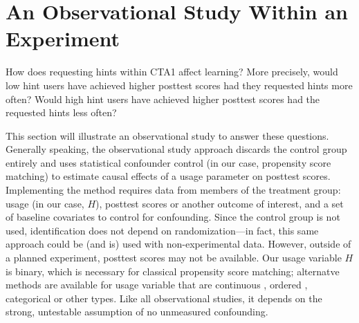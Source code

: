 \documentclass{article}\usepackage[]{graphicx}\usepackage[]{color}
\begin{document}
\begin{table}[ht]
\centering

\caption{Missingness information, control (``BaU'' or ``Business as
  Usual'') and treatment (``CTA1'') means, and balance for the
  covariates included in this study, from the high school year two
  stratum of CTA1 Effectiveness experiment. Imputation error is percent falsely classified for
  categorical variables (Race/Ethnicity, Sex, and Special Education)
  and standardized root mean squared error for Pretest, which is
  continuous. %
  Analysis done in \texttt{R} via \texttt{RItools} \citep{ritools}.}
\label{tab:covariateBalance}
\end{table}


\section{An Observational Study Within an Experiment}\label{sec:observational}

How does requesting hints within CTA1 affect learning?
More precisely, would low hint users have achieved higher posttest scores
had they requested hints more often?
Would high hint users have achieved higher posttest scores had the
requested hints less often?

This section will illustrate an observational study to answer these
questions.
Generally speaking, the observational study approach discards the
control group entirely and uses statistical confounder control (in our
case, propensity score matching) to estimate causal effects of a usage parameter on posttest scores.
Implementing the method requires data from members of the treatment group: usage (in our case, $H$), posttest scores or another outcome of interest, and a set of baseline covariates to control for confounding.
Since the control group is not used, identification does not depend on randomization---in fact, this same approach could be (and is) used with non-experimental data.
However, outside of a planned experiment, posttest scores may not be available.
Our usage variable $H$ is binary, which is necessary for classical propensity score matching; alternatve methods are available for usage variable that are continuous \citep[e.g.][]{hirano2004propensity}, ordered \citep[e.g.][]{leon2005mixed}, categorical \citep[e.g.][]{lopez2017estimation} or other types.
Like all observational studies, it depends on the strong, untestable assumption of no unmeasured confounding.
\end{document}

